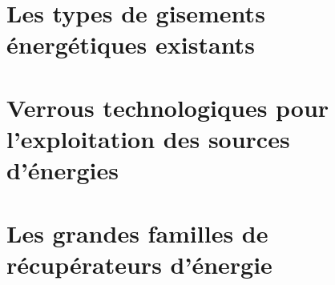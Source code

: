 \section{Les types de gisements énergétiques existants}
\label{sec:1.2}

\section{Verrous technologiques pour l’exploitation des sources d’énergies}
\label{sec:1.3}

\section{Les grandes familles de récupérateurs d’énergie}
\label{sec:1.4}



